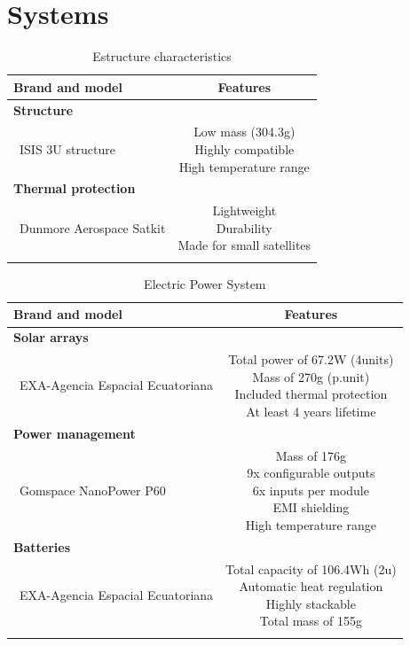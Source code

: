 \section{Systems}
\begin{longtable}{| l | c  }
	\hline
	\rowcolor[gray]{0.80}	\textbf{Brand and model} &  \textbf{Features}     \\
	\hline
	\endfirsthead
	
	\rowcolor[gray]{0.85} \textbf{Structure} &  \\
	~ISIS 3U structure & \makecell{Low mass (304.3g) \\ Highly compatible \\ High temperature range}\\
	\hline
	\rowcolor[gray]{0.85} \textbf{Thermal protection} &  \\
	~Dunmore Aerospace Satkit & \makecell{Lightweight \\ Durability \\ Made for small satellites}\\
	\hline
		
	\caption{Estructure characteristics}
	\label{structureoptions}
\end{longtable}

\begin{longtable}{| l | c | }
	\hline
	\rowcolor[gray]{0.80}	\textbf{Brand and model} &  \textbf{Features}     \\
	\hline
	\endfirsthead
	
	\rowcolor[gray]{0.85} \textbf{Solar arrays} &  \\
	~EXA-Agencia Espacial Ecuatoriana & \makecell{Total power of 67.2W (4units)\\ Mass of 270g (p.unit) \\ Included thermal protection \\At least 4 years lifetime}  \\
	\hline
	\rowcolor[gray]{0.85} \textbf{Power management} &   \\
	~Gomspace NanoPower P60 & \makecell{Mass of 176g \\ 9x configurable outputs \\ 6x inputs per module \\ EMI shielding \\ High temperature range} \\
	\hline
	\rowcolor[gray]{0.85} \textbf{Batteries} &   \\
	~EXA-Agencia Espacial Ecuatoriana & \makecell{Total capacity of 106.4Wh (2u)\\ Automatic heat regulation \\ Highly stackable \\ Total mass of 155g} \\
	\hline
	
	\caption{Electric Power System}
	\label{epsoptions}
\end{longtable}
\clearpage

